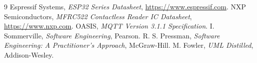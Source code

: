 \documentclass[11pt,a4paper]{article}
\begin{document}
\begin{thebibliography}{9}
 Espressif Systems, \emph{ESP32 Series Datasheet}, \url{https://www.espressif.com}.
 NXP Semiconductors, \emph{MFRC522 Contactless Reader IC Datasheet}, \url{https://www.nxp.com}.
 OASIS, \emph{MQTT Version 3.1.1 Specification}.
 I. Sommerville, \emph{Software Engineering}, Pearson.
 R. S. Pressman, \emph{Software Engineering: A Practitioner's Approach}, McGraw-Hill.
 M. Fowler, \emph{UML Distilled}, Addison-Wesley.
\end{thebibliography}
 
\end{document}
